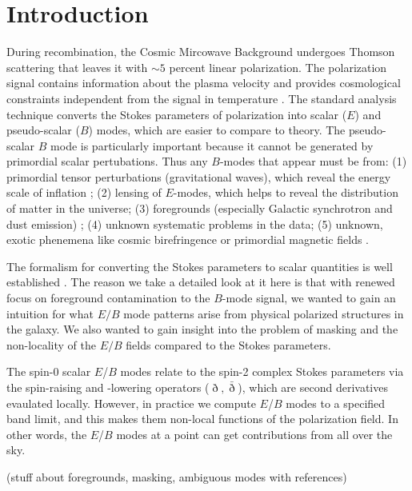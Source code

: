 \section{Introduction}
During recombination, the Cosmic Mircowave Background undergoes Thomson scattering that leaves it with $\sim 5$ percent linear polarization.  The polarization signal contains information about the plasma velocity and provides cosmological constraints independent from the signal in temperature \citep{1997NewA....2..323H}.  The standard analysis technique converts the Stokes parameters of polarization into scalar ($E$) and pseudo-scalar ($B$) modes, which are easier to compare to theory.  The pseudo-scalar $B$ mode is particularly important because it cannot be generated by primordial scalar pertubations.  Thus any $B$-modes that appear must be from:
(1) primordial tensor perturbations (gravitational waves), which reveal the energy scale of inflation
\citep{1997PhRvD..56..596H,1997PhRvL..78.2054S};
(2) lensing of $E$-modes, which helps to reveal the distribution of matter in the universe;
(3) foregrounds (especially Galactic synchrotron and dust emission)
\citep{2016A&A...586A.133P};
(4) unknown systematic problems in the data;
(5) unknown, exotic phenemena like cosmic birefringence or primordial magnetic fields
\citep{1996ApJ...469....1K,1999PhRvL..83.1506L,2004ApJ...616....1C,2014MNRAS.438.2508P}.
 
 
The formalism for converting the Stokes parameters to scalar quantities is well established \citep{1997PhRvD..55.7368K,1997PhRvD..55.1830Z}.  The reason we take a detailed look at it here is that with renewed focus on foreground contamination to the $B$-mode signal, we wanted to gain an intuition for what $E/B$ mode patterns arise from physical polarized structures in the galaxy.  We also wanted to gain insight into the problem of masking and the non-locality of the $E/B$ fields compared to the Stokes parameters.

The spin-0 scalar $E$/$B$ modes relate to the spin-2 complex Stokes parameters via the spin-raising and -lowering operators ($\eth,\bar \eth$), which are second derivatives evaulated locally.  However, in practice we compute $E$/$B$ modes to a specified band limit, and this makes them non-local functions of the polarization field.  In other words, the $E$/$B$ modes at a point can get contributions from all over the sky.

(stuff about foregrounds, masking, ambiguous modes with references)
 
